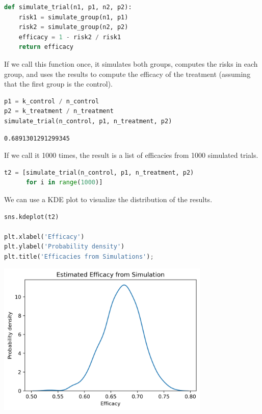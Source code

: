 \begin{lstlisting}[language=Python,style=source]
def simulate_trial(n1, p1, n2, p2):
    risk1 = simulate_group(n1, p1)
    risk2 = simulate_group(n2, p2)
    efficacy = 1 - risk2 / risk1
    return efficacy
\end{lstlisting}

If we call this function once, it simulates both groups, computes the
risks in each group, and uses the results to compute the efficacy of the
treatment (assuming that the first group is the control).

\begin{lstlisting}[language=Python,style=source]
p1 = k_control / n_control
p2 = k_treatment / n_treatment
simulate_trial(n_control, p1, n_treatment, p2)
\end{lstlisting}

\begin{lstlisting}[style=output]
0.6891301291299345
\end{lstlisting}

If we call it 1000 times, the result is a list of efficacies from 1000
simulated trials.

\begin{lstlisting}[language=Python,style=source]
t2 = [simulate_trial(n_control, p1, n_treatment, p2)
      for i in range(1000)]
\end{lstlisting}

We can use a KDE plot to visualize the distribution of the results.

\begin{lstlisting}[language=Python,style=source]
sns.kdeplot(t2)

plt.xlabel('Efficacy')
plt.ylabel('Probability density')
plt.title('Efficacies from Simulations');
\end{lstlisting}

\begin{center}
\includegraphics[width=4in]{chapters/11_resampling_files/11_resampling_45_0.png}
\end{center}

